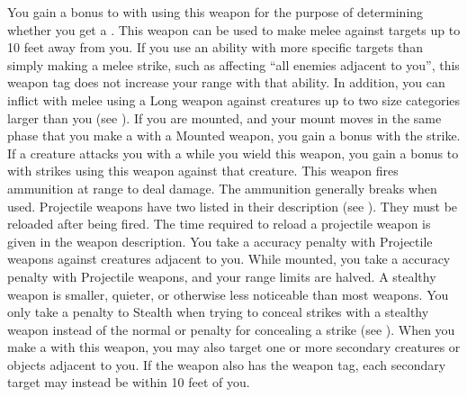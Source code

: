          You gain a  bonus to  with  using this weapon for the purpose of determining whether you get a .
        \label{Long Weapon} This weapon can be used to make melee  against targets up to 10 feet away from you.
        If you use an ability with more specific targets than simply making a melee strike, such as affecting ``all enemies adjacent to you'', this weapon tag does not increase your range with that ability.
        In addition, you can inflict  with melee  using a Long weapon against creatures up to two size categories larger than you (see ).
        \label{Mounted Weapon} If you are mounted, and your mount moves in the same phase that you make a  with a Mounted weapon, you gain a   bonus with the strike.
         If a creature attacks you with a   while you wield this weapon, you  gain a  bonus to  with strikes using this weapon against that creature.
         This weapon fires ammunition at range to deal damage.
        The ammunition generally breaks when used.
        Projectile weapons have two  listed in their description (see ).
        They must be reloaded after being fired.
        The time required to reload a projectile weapon is given in the weapon description.
        You take a  accuracy penalty with Projectile weapons against creatures adjacent to you.
        While mounted, you take a  accuracy penalty with Projectile weapons, and your range limits are halved.
        A stealthy weapon is smaller, quieter, or otherwise less noticeable than most weapons.
        You only take a  penalty to Stealth when trying to conceal strikes with a stealthy weapon instead of the normal  or  penalty for concealing a strike (see ).
        \label{Sweeping} When you make a   with this weapon, you may also target one or more secondary creatures or objects adjacent to you.
        If the weapon also has the  weapon tag, each secondary target may instead be within 10 feet of you.
